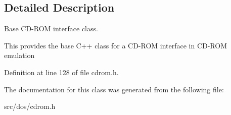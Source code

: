 \subsection{Detailed Description}
Base C\-D-\/\-R\-O\-M interface class. 

This provides the base C++ class for a C\-D-\/\-R\-O\-M interface in C\-D-\/\-R\-O\-M emulation 

Definition at line 128 of file cdrom.\-h.



The documentation for this class was generated from the following file\-:\begin{DoxyCompactItemize}
\item 
src/dos/cdrom.\-h\end{DoxyCompactItemize}
